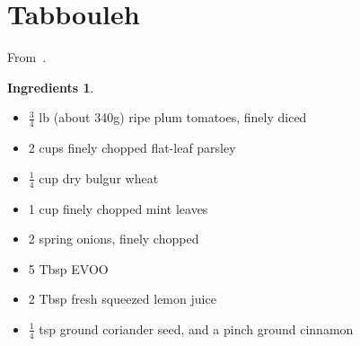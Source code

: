 \documentclass[a4paper,12pt]{scrreprt}
\theoremstyle{definition}
\newtheorem*{ingredients}{Ingredients}
\theoremstyle{plain}
\theoremstyle{remark}
\begin{document}
\section{Tabbouleh}
From~\cite{seriouseatstabbouleh}.
\begin{ingredients}
  $\,$
  \begin{multicols}{2}
    \begin{itemize}
      \item $\frac{3}{4}$ lb (about 340g) ripe plum tomatoes, finely diced

      \item 2 cups finely chopped flat-leaf parsley

      \item $\frac{1}{4}$ cup dry bulgur wheat

      \item 1 cup finely chopped mint leaves

      \item 2 spring onions, finely chopped

      \item 5 Tbsp EVOO

      \item 2 Tbsp fresh squeezed lemon juice

      \item $\frac{1}{4}$ tsp ground coriander seed, and a pinch ground cinnamon
    \end{itemize}
  \end{multicols}
\end{ingredients}
\end{document}
